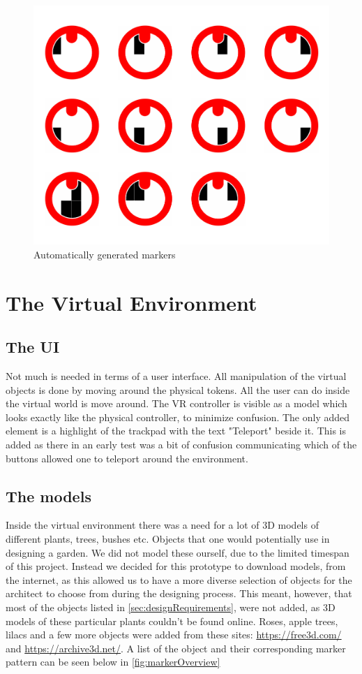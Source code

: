 \begin{figure}[H]
	\centering
	\includegraphics[width=0.7\linewidth]{figure/Analysis/result}
	\caption{Automatically generated markers}
	\label{fig:result}
\end{figure}


\section{The Virtual Environment}
\subsection{The UI}
Not much is needed in terms of a user interface. All manipulation of the virtual objects is done by moving around the physical tokens. All the user can do inside the virtual world is move around. The VR controller is visible as a model which looks exactly like the physical controller, to minimize confusion. The only added element is a highlight of the trackpad with the text "Teleport" beside it. This is added as there in an early test was a bit of confusion communicating which of the buttons allowed one to teleport around the environment.

\subsection{The models}
Inside the virtual environment there was a need for a lot of 3D models of different plants, trees, bushes etc. Objects that one would potentially use in designing a garden. We did not model these ourself, due to the limited timespan of this project. Instead we decided for this prototype to download models, from the internet, as this allowed us to have a more diverse selection of objects for the architect to choose from during the designing process. This meant, however, that most of the objects listed in \autoref{sec:designRequirements}, were not added, as 3D models of these particular plants couldn't be found online. Roses, apple trees, lilacs and a few more objects were added from these sites: \url{https://free3d.com/} and \url{https://archive3d.net/}. A list of the object and their corresponding marker pattern can be seen below in \autoref{fig:markerOverview}

